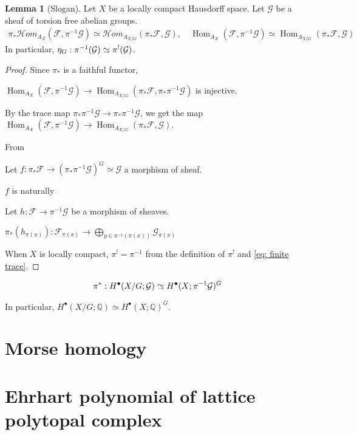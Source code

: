 \documentclass[a4paper,dvipdfmx,reqno,12pt]{amsart}
\theoremstyle{definition}
\newtheorem{Lem}[Thm]{Lemma}
\newcommand{\Q}{\mathbb{Q}}%
\newcommand{\mcal}[1]{\mathcal{#1}}%
\newcommand{\opn}[1]{\operatorname{#1}}
\newcommand{\simto}{ 
\mathrel{\raisebox{0.13em}{${\sim}$}}
\kern -0.75em \mathrel{\raisebox{-0.11em}{${\scriptstyle \to}$}}  
}
\numberwithin{equation}{section}
\begin{document}
\begin{Lem}[Slogan]
  Let $X$ be a locally compact Hausdorff space. Let $\mcal{G}$ be a sheaf of
  torsion free abelian groups.
  \begin{align} \label{eq: finite trace}
    \pi_*\mcal{H}om_{A_{X}}(\mcal{F},\pi^{-1}\mcal{G})\simeq
    \mcal{H}om_{A_{X/G}}(\pi_*\mcal{F},\mcal{G}), \quad
    \opn{Hom}_{A_{X}}(\mcal{F},\pi^{-1}\mcal{G})\simeq
    \opn{Hom}_{A_{X/G}}(\pi_*\mcal{F},\mcal{G})
  \end{align}
  In particular, $\eta_{G}:\pi^{-1}(\mcal{G})\simto \pi^{!}(\mcal{G})$.
\end{Lem}
\begin{proof}
  Since $\pi_*$ is a faithful functor,

  $\opn{Hom}_{A_{X}}(\mcal{F},\pi^{-1}\mcal{G})
    \to \opn{Hom}_{A_{X/G}}(\pi_*\mcal{F},\pi_*\pi^{-1}\mcal{G})$
  is injective.

  By the trace map $\pi_*\pi^{-1}\mcal{G}\to \pi_*\pi^{-1}\mcal{G}$,
  we get the map
  $\opn{Hom}_{A_{X}}(\mcal{F},\pi^{-1}\mcal{G})
    \to \opn{Hom}_{A_{X/G}}(\pi_*\mcal{F},\mcal{G})$.

  From

  Let $f:\pi_*\mcal{F}\to (\pi_*\pi^{-1}\mcal{G})^{G}\simeq \mcal{G}$ a morphism of sheaf.

  $f$ is naturally

  Let $h:\mcal{F}\to \pi^{-1}\mcal{G}$ be a morphism of sheaves.

  $\pi_*(h_{\pi(x)}): \mcal{F}_{\pi(x)}\to \bigoplus_{y\in \pi^{-1}(\pi(x))}\mcal{G}_{\pi(x)}$

  When $X$ is locally compact,
  $\pi^{!}=\pi^{-1}$ from the definition of $\pi^{!}$ and \cref{eq: finite trace}.
\end{proof}
\cite[Theorem 19.2]{bredonSheafTheory1997a}
\begin{align}
  \pi^{*}: H^{\bullet}(X/G;\mcal{G})\simto  H^{\bullet}(X;\pi^{-1}\mcal{G})^{G}
\end{align}

In particular, $H^{\bullet}(X/G;\Q)\simeq H^{\bullet}(X;\Q)^{G}$.


\section{Morse homology} \label{sec: Morse}

\section{Ehrhart polynomial of lattice polytopal complex}
\end{document}
